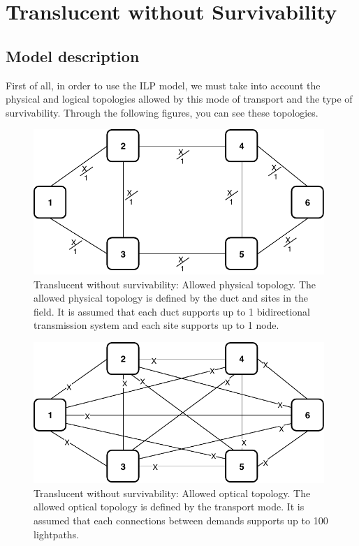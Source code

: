 \clearpage

\section{Translucent without Survivability}\label{ILP_Transluc_Survivability}

\subsection{Model description}

First of all, in order to use the ILP model, we must take into account the physical and logical topologies allowed by this mode of transport and the type of survivability. Through the following figures, you can see these topologies. \\

\begin{figure}[h!]
\centering
\includegraphics[width=11cm]{sdf/ilp/translucent_survivability/figures/allowed_physical_topology}
\caption{Translucent without survivability: Allowed physical topology. The allowed physical topology is defined by the duct and sites in the field. It is assumed that each duct supports up to 1 bidirectional transmission system and each site supports up to 1 node.}
\label{allowed3_physical_low}
\end{figure}

\vspace{15pt}
\begin{figure}[h!]
\centering
\includegraphics[width=11cm]{sdf/ilp/translucent_survivability/figures/allowed_optical_topology}
\caption{Translucent without survivability: Allowed optical topology. The allowed optical topology is defined by the transport mode. It is assumed that each connections between demands supports up to 100 lightpaths.}
\label{allowed3_optical_low}
\end{figure}

